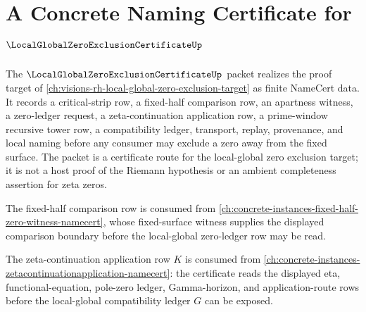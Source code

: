 \chapter{A Concrete Naming Certificate for $\LocalGlobalZeroExclusionCertificateUp$}
\label{ch:concrete-instances-local-global-zero-exclusion-certificate-namecert}

The $\LocalGlobalZeroExclusionCertificateUp$ packet realizes the proof target of \autoref{ch:visions-rh-local-global-zero-exclusion-target} as finite NameCert data. It records a critical-strip row, a fixed-half comparison row, an apartness witness, a zero-ledger request, a zeta-continuation application row, a prime-window recursive tower row, a compatibility ledger, transport, replay, provenance, and local naming before any consumer may exclude a zero away from the fixed surface. The packet is a certificate route for the local-global zero exclusion target; it is not a host proof of the Riemann hypothesis or an ambient completeness assertion for zeta zeros.

The fixed-half comparison row is consumed from \autoref{ch:concrete-instances-fixed-half-zero-witness-namecert}, whose fixed-surface witness supplies the displayed comparison boundary before the local-global zero-ledger row may be read.

The zeta-continuation application row $K$ is consumed from \autoref{ch:concrete-instances-zetacontinuationapplication-namecert}: the certificate reads the displayed eta, functional-equation, pole-zero ledger, Gamma-horizon, and application-route rows before the local-global compatibility ledger $G$ can be exposed.

